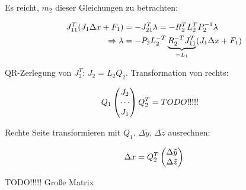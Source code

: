 Es reicht, $m_2$ dieser Gleichungen zu betrachten:

\begin{align*}
J_{11}^T (J_1 \Delta x + F_1) &= - J_{21}^T \lambda = - R_2^T L_2^T P_2^{-1} \lambda \\
\Rightarrow \lambda &= - P_2 L_2^{-T} \underbrace{R_2^{-T} J_{11}^T}_{=L_1} (J_1 \Delta x + F_1)
\end{align*}


QR-Zerlegung von $J_2^T$: $J_2 = L_2 Q_2$. Transformation von rechts:

\begin{align*}
Q_1 \begin{pmatrix} J_2 \\ \cdots \\ J_1 \end{pmatrix} Q_2^T &= TODO!!!!!
\end{align*}

Rechte Seite transformieren mit $Q_1$, $\Delta \tilde y$, $\Delta \tilde z$ ausrechnen:

\[ \Delta x = Q_2^T \begin{pmatrix} \Delta \tilde y \\ \Delta \tilde z \end{pmatrix} \]


TODO!!!!! Große Matrix






























